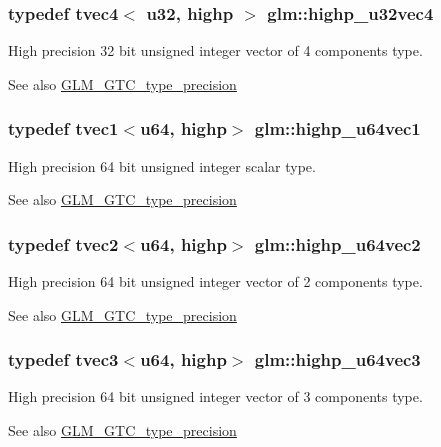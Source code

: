 \subsubsection[{highp\+\_\+u32vec4}]{\setlength{\rightskip}{0pt plus 5cm}typedef tvec4$<$ {\bf u32}, highp $>$ {\bf glm\+::highp\+\_\+u32vec4}}\label{namespaceglm_ad6f92f734328c938625f719cec206a15}
High precision 32 bit unsigned integer vector of 4 components type. \begin{DoxySeeAlso}{See also}
\hyperlink{group__gtc__type__precision}{G\+L\+M\+\_\+\+G\+T\+C\+\_\+type\+\_\+precision} 
\end{DoxySeeAlso}
\hypertarget{namespaceglm_ab40d45399efc4de5cc9c31311e70d8b5}{}
\subsubsection[{highp\+\_\+u64vec1}]{\setlength{\rightskip}{0pt plus 5cm}typedef tvec1$<${\bf u64}, highp$>$ {\bf glm\+::highp\+\_\+u64vec1}}\label{namespaceglm_ab40d45399efc4de5cc9c31311e70d8b5}
High precision 64 bit unsigned integer scalar type. \begin{DoxySeeAlso}{See also}
\hyperlink{group__gtc__type__precision}{G\+L\+M\+\_\+\+G\+T\+C\+\_\+type\+\_\+precision} 
\end{DoxySeeAlso}
\hypertarget{namespaceglm_ad2aeff7982b68bc1beee06a79f172c44}{}
\subsubsection[{highp\+\_\+u64vec2}]{\setlength{\rightskip}{0pt plus 5cm}typedef tvec2$<${\bf u64}, highp$>$ {\bf glm\+::highp\+\_\+u64vec2}}\label{namespaceglm_ad2aeff7982b68bc1beee06a79f172c44}
High precision 64 bit unsigned integer vector of 2 components type. \begin{DoxySeeAlso}{See also}
\hyperlink{group__gtc__type__precision}{G\+L\+M\+\_\+\+G\+T\+C\+\_\+type\+\_\+precision} 
\end{DoxySeeAlso}
\hypertarget{namespaceglm_ad7722375e84d6940412d3b715fec1160}{}
\subsubsection[{highp\+\_\+u64vec3}]{\setlength{\rightskip}{0pt plus 5cm}typedef tvec3$<${\bf u64}, highp$>$ {\bf glm\+::highp\+\_\+u64vec3}}\label{namespaceglm_ad7722375e84d6940412d3b715fec1160}
High precision 64 bit unsigned integer vector of 3 components type. \begin{DoxySeeAlso}{See also}
\hyperlink{group__gtc__type__precision}{G\+L\+M\+\_\+\+G\+T\+C\+\_\+type\+\_\+precision} 
\end{DoxySeeAlso}
\hypertarget{namespaceglm_ae7af7cc2241c15afac54724f0b8855f2}{}
